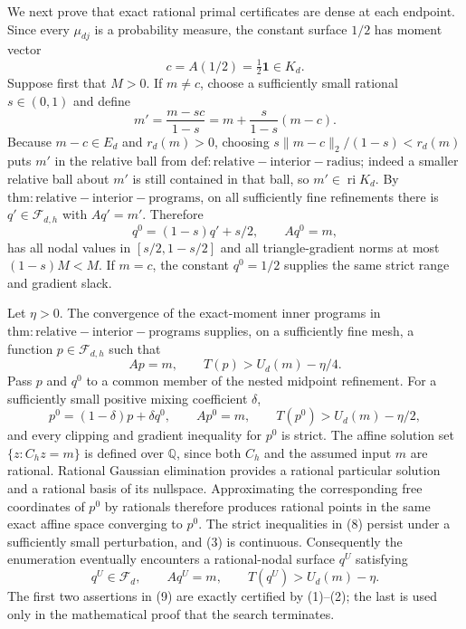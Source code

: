 We next prove that exact rational primal certificates are dense at each
endpoint.  Since every \(\mu_{dj}\) is a probability measure, the constant
surface \(1/2\) has moment vector
\[
 c=A(1/2)=\tfrac12\mathbf 1\in K_d.                         \tag{4}
\]
Suppose first that \(M>0\).  If \(m\neq c\), choose a sufficiently small
rational \(s\in(0,1)\) and define
\[
 m'=\frac{m-sc}{1-s}
    =m+\frac{s}{1-s}(m-c).                                  \tag{5}
\]
Because \(m-c\in E_d\) and \(r_d(m)>0\), choosing
\(s\|m-c\|_2/(1-s)<r_d(m)\) puts \(m'\) in the relative ball from
\(\mathrm{def:relative-interior-radius}\); indeed a smaller relative ball
about \(m'\) is still contained in that ball, so \(m'\in\operatorname{ri}K_d\).
By \(\mathrm{thm:relative-interior-programs}\), on all sufficiently fine
refinements there is \(q'\in\mathcal F_{d,h}\) with \(Aq'=m'\).  Therefore
\[
 q^0=(1-s)q'+s/2,
 \qquad Aq^0=m,                                              \tag{6}
\]
has all nodal values in \([s/2,1-s/2]\) and all triangle-gradient norms at
most \((1-s)M<M\).  If \(m=c\), the constant \(q^0=1/2\) supplies the same
strict range and gradient slack.

Let \(\eta>0\).  The convergence of the exact-moment inner programs in
\(\mathrm{thm:relative-interior-programs}\) supplies, on a sufficiently fine
mesh, a function \(p\in\mathcal F_{d,h}\) such that
\[
 Ap=m,
 \qquad T(p)>U_d(m)-\eta/4.                                 \tag{7}
\]
Pass \(p\) and \(q^0\) to a common member of the nested midpoint refinement.
For a sufficiently small positive mixing coefficient \(\delta\),
\[
 p^0=(1-\delta)p+\delta q^0,
 \qquad Ap^0=m,
 \qquad T(p^0)>U_d(m)-\eta/2,                               \tag{8}
\]
and every clipping and gradient inequality for \(p^0\) is strict.  The affine
solution set \(\{z:C_hz=m\}\) is defined over \(\mathbb Q\), since both
\(C_h\) and the assumed input \(m\) are rational.  Rational Gaussian
elimination provides a rational particular solution and a rational basis of
its nullspace.  Approximating the corresponding free coordinates of \(p^0\)
by rationals therefore produces rational points in the same exact affine
space converging to \(p^0\).  The strict inequalities in (8) persist under a
sufficiently small perturbation, and (3) is continuous.  Consequently the
enumeration eventually encounters a rational-nodal surface \(q^U\) satisfying
\[
 q^U\in\mathcal F_d,
 \qquad Aq^U=m,
 \qquad T(q^U)>U_d(m)-\eta.                                 \tag{9}
\]
The first two assertions in (9) are exactly certified by (1)--(2); the last is
used only in the mathematical proof that the search terminates.

